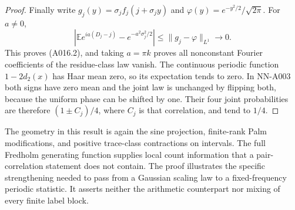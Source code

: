 \begin{proof}
Finally write $g_j(y)=\sigma_j f_j(j+\sigma_j y)$ and
$\varphi(y)=e^{-y^2/2}/\sqrt{2\pi}$. For $a\ne0$,
\[
 \left|\mathbb E e^{ia(D_j-j)}-e^{-a^2\sigma_j^2/2}\right|
 \le\|g_j-\varphi\|_{L^1}\longrightarrow0.
\]
This proves (A016.2), and taking $a=\pi k$ proves all nonconstant
Fourier coefficients of the residue-class law vanish. The continuous
periodic function $1-2d_2(x)$ has Haar mean zero, so its expectation
tends to zero. In NN-A003 both signs have zero mean and the joint
law is unchanged by flipping both, because the uniform phase can
be shifted by one. Their four joint probabilities are therefore
$(1\pm C_j)/4$, where $C_j$ is that correlation, and tend to $1/4$.
\end{proof}

The geometry in this result is again the sine projection, finite-rank
Palm modifications, and positive trace-class contractions on intervals.
The full Fredholm generating function supplies local count information
that a pair-correlation statement does not contain. The proof illustrates
the specific strengthening needed to pass from a Gaussian scaling law
to a fixed-frequency periodic statistic. It asserts neither the
arithmetic counterpart nor mixing of every finite label block.
